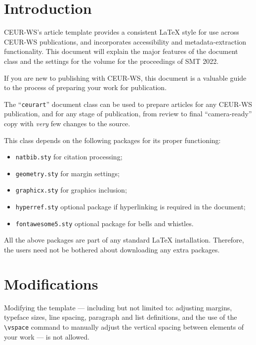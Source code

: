 \documentclass{ceurart}
\begin{document}
\maketitle

\section{Introduction}

CEUR-WS's article template provides a consistent \LaTeX{} style for
use across CEUR-WS publications, and incorporates accessibility and
metadata-extraction functionality. This document will explain the
major features of the document class and the settings for the volume
for the proceedings of SMT 2022.

If you are new to publishing with CEUR-WS, this document is a valuable
guide to the process of preparing your work for publication.

The ``\verb|ceurart|'' document class can be used to prepare articles
for any CEUR-WS publication, and for any stage of publication, from
review to final ``camera-ready'' copy with {\itshape very} few changes
to the source.

This class depends on the following packages
for its proper functioning:

\begin{itemize}
\item \verb|natbib.sty| for citation processing;
\item \verb|geometry.sty| for margin settings;
\item \verb|graphicx.sty| for graphics inclusion;
\item \verb|hyperref.sty| optional package if hyperlinking is required in
  the document;
\item \verb|fontawesome5.sty| optional package for bells and whistles.
\end{itemize}

All the above packages are part of any
standard \LaTeX{} installation.
Therefore, the users need not be
bothered about downloading any extra packages.

\section{Modifications}

Modifying the template --- including but not limited to: adjusting
margins, typeface sizes, line spacing, paragraph and list definitions,
and the use of the \verb|\vspace| command to manually adjust the
vertical spacing between elements of your work --- is not allowed.
\end{document}
